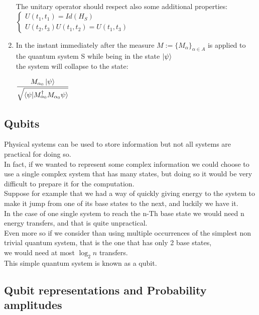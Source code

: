 \documentclass{article}
\begin{document}
\begin{enumerate}
	      The unitary operator should respect also some additional
	      properties:\\
	      $
		      \begin{cases}
			      U(t_1,t_1) = Id(H_S) \\
			      U(t_2,t_3)U(t_1,t_2) = U(t_1,t_3)
		      \end{cases} $

	\item In the instant immediately after the measure
	      $M := \{M_\alpha \}_{\alpha\in A}$ is applied to the quantum
	      system S while being in the state $\ket{\psi}$ \\
	      the system will collapse to the state:

	      \begin{center}
		      $\dfrac{M_{\alpha_0}\ket\psi}
			      {\sqrt{\braket{\psi|M_{\alpha_0}^\dag M_{\alpha_0}\psi}}}$
	      \end{center}
\end{enumerate}


\subsection{Qubits}

Physical systems can be used to store information
but not all systems are practical for doing so. \\
In fact, if we wanted to represent some complex information we
could choose to use a single complex system that has many states,
but doing so it would be very difficult to prepare it for the
computation.\\
Suppose for example that we had a way of quickly giving energy
to the system to make it jump from one of its base states to
the next, and luckily we have it.\\
In the case of one single system to reach the n-Th base state
we would need n energy transfers, and that is quite unpractical.\\
Even more so if we consider than using multiple occurrences of
the simplest non trivial quantum system, that is the one that
has only 2 base states,\\ we would need at most $\log_2{n}$ transfers.\\
This simple quantum system is known as a qubit.\\

\subsection{Qubit representations and Probability amplitudes}
\end{document}
